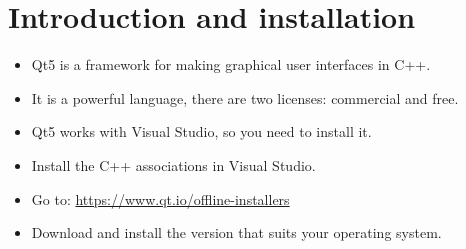 \section{Introduction and installation}
\begin{itemize}
    \item Qt5 is a framework for making graphical user interfaces in C++.
    \item It is a powerful language, there are two licenses: commercial and free.
    \item Qt5 works with Visual Studio, so you need to install it.
    \item Install the C++ associations in Visual Studio.
    \item Go to: \url{https://www.qt.io/offline-installers}
    \item Download and install the version that suits your operating system.
\end{itemize}
